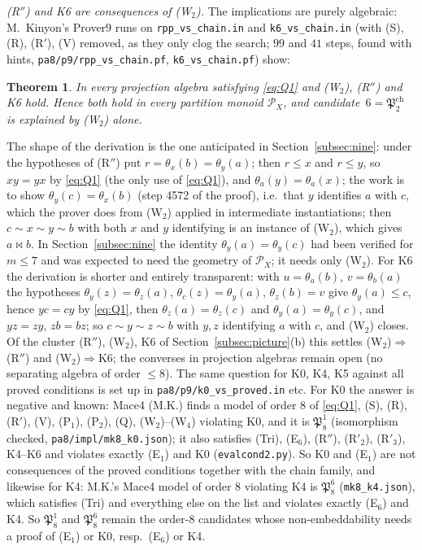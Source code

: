 \documentclass[11pt]{amsart}
\newtheorem{theorem}{Theorem}[section]
\theoremstyle{definition}
\renewcommand{\P}{\mathcal{P}}
\newcommand{\mt}{\bowtie}   %
\begin{document}
\emph{(R$''$) and K6 are consequences of (W$_2$).} The implications are purely algebraic: M.~Kinyon's Prover9 runs on \texttt{rpp\_vs\_chain.in} and \texttt{k6\_vs\_chain.in} (with (S), (R), (R$'$), (V) removed, as they only clog the search; $99$ and $41$ steps, found with hints, \texttt{pa8/p9/rpp\_vs\_chain.pf}, \texttt{k6\_vs\_chain.pf}) show:

\begin{theorem}\label{thm:Rpp}
In every projection algebra satisfying \eqref{eq:Q1} and \textup{(W$_2$)}, \textup{(R$''$)} and \textup{K6} hold. Hence both hold in every partition monoid $\P_X$, and candidate~$6=\mathfrak P^{\mathrm{ch}}_2$ is explained by \textup{(W$_2$)} alone.
\end{theorem}

The shape of the derivation is the one anticipated in Section~\ref{subsec:nine}: under the hypotheses of (R$''$) put $r=\theta_x(b)=\theta_y(a)$; then $r\le x$ and $r\le y$, so $xy=yx$ by \eqref{eq:Q1} (the only use of \eqref{eq:Q1}), and $\theta_a(y)=\theta_a(x)$; the work is to show $\theta_y(c)=\theta_x(b)$ (step 4572 of the proof), i.e.\ that $y$ identifies $a$ with $c$, which the prover does from (W$_2$) applied in intermediate instantiations; then $c\sim x\sim y\sim b$ with both $x$ and $y$ identifying is an instance of (W$_2$), which gives $a\mt b$. In Section~\ref{subsec:nine} the identity $\theta_y(a)=\theta_y(c)$ had been verified for $m\le7$ and was expected to need the geometry of $\P_X$; it needs only (W$_2$). For K6 the derivation is shorter and entirely transparent: with $u=\theta_a(b)$, $v=\theta_b(a)$ the hypotheses $\theta_y(z)=\theta_z(a)$, $\theta_c(z)=\theta_y(a)$, $\theta_z(b)=v$ give $\theta_y(a)\le c$, hence $yc=cy$ by \eqref{eq:Q1}, then $\theta_z(a)=\theta_z(c)$ and $\theta_y(a)=\theta_y(c)$, and $yz=zy$, $zb=bz$; so $c\sim y\sim z\sim b$ with $y,z$ identifying $a$ with $c$, and (W$_2$) closes. Of the cluster (R$''$), (W$_2$), K6 of Section~\ref{subsec:picture}(b) this settles (W$_2$)$\Rightarrow$(R$''$) and (W$_2$)$\Rightarrow$K6; the converses in projection algebras remain open (no separating algebra of order $\le8$). The same question for K0, K4, K5 against all proved conditions is set up in \texttt{pa8/p9/k0\_vs\_proved.in} etc. For K0 the answer is negative and known: Mace4 (M.K.) finds a model of order $8$ of \eqref{eq:Q1}, (S), (R), (R$'$), (V), (P$_1$), (P$_2$), (Q), (W$_2$)--(W$_4$) violating K0, and it is $\mathfrak P_8^1$ (isomorphism checked, \texttt{pa8/impl/mk8\_k0.json}); it also satisfies (Tri), (E$_6$), (R$''$), (R$'_2$), (R$'_3$), K4--K6 and violates exactly (E$_1$) and K0 (\texttt{evalcond2.py}). So K0 and (E$_1$) are not consequences of the proved conditions together with the chain family, and likewise for K4: M.K.'s Mace4 model of order $8$ violating K4 is $\mathfrak P_8^6$ (\texttt{mk8\_k4.json}), which satisfies (Tri) and everything else on the list and violates exactly (E$_6$) and K4. So $\mathfrak P_8^1$ and $\mathfrak P_8^6$ remain the order-$8$ candidates whose non-embeddability needs a proof of (E$_1$) or K0, resp.\ (E$_6$) or K4.
\end{document}
